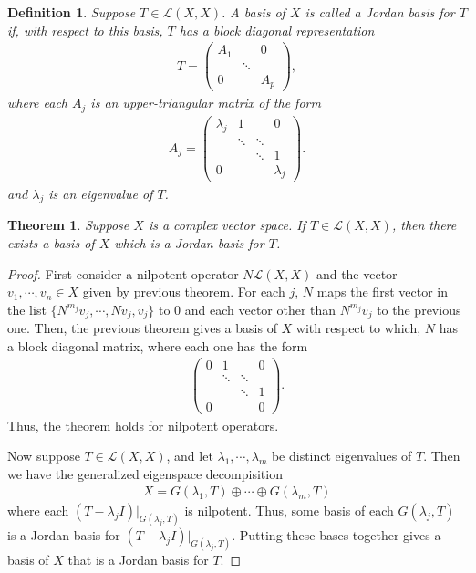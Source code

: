 \documentclass[11pt]{book}
\newtheorem{definition}{Definition}[section]
\newtheorem{theorem}{Theorem}[section]
\theoremstyle{definition}
\numberwithin{equation}{chapter}
\begin{document}
\medskip

\begin{definition}
Suppose $T\in\mathcal{L}(X,X)$. A basis of $X$ is called a Jordan basis for $T$ if, with respect to this basis, $T$ has a block diagonal representation
\begin{align*}
    T = \begin{pmatrix}
    A_1 &  & 0 \\
     & \ddots &  \\
    0 &  & A_p 
    \end{pmatrix},
\end{align*}
where each $A_j$ is an upper-triangular matrix of the form
\begin{align*}
    A_j = \begin{pmatrix}
    \lambda_j & 1 & & 0 \\
     & \ddots &  \ddots & \\
     &  & \ddots & 1 \\
    0 & & & \lambda_j
    \end{pmatrix}.
\end{align*}
and $\lambda_j$ is an eigenvalue of $T$.
\end{definition}

\medskip

\begin{theorem}
Suppose $X$ is a complex vector space. If $T\in\mathcal{L}(X,X)$, then there exists a basis of $X$ which is a Jordan basis for $T$.
\end{theorem}
\begin{proof}
First consider a nilpotent operator $N\mathcal{L}(X,X)$ and the vector $v_1,\cdots,v_n \in X$ given by previous theorem. For each $j$, $N$ maps the first vector in the list $\{N^{m_j}v_j, \cdots, Nv_j,v_j\}$ to $0$ and each vector other than $N^{m_j}v_j$ to the previous one. Then, the previous theorem gives a basis of $X$ with respect to which, $N$ has a block diagonal matrix, where each one has the form 
\begin{align*}
    \begin{pmatrix}
    0 & 1 & & 0 \\
     & \ddots &  \ddots & \\
     &  & \ddots & 1 \\
    0 & & & 0
    \end{pmatrix}.
\end{align*}
Thus, the theorem holds for nilpotent operators. 

Now suppose $T\in\mathcal{L}(X,X)$, and let $\lambda_1,\cdots,\lambda_m$ be distinct eigenvalues of $T$. Then we have the generalized eigenspace decompisition
\begin{align*}
    X = G(\lambda_1, T)\oplus \cdots \oplus G(\lambda_m, T)
\end{align*}
where each $(T-\lambda_j I)|_{G(\lambda_j, T)}$ is nilpotent. Thus, some basis of each $G(\lambda_j,T)$ is a Jordan basis for $(T-\lambda_j I)|_{G(\lambda_j, T)}$. Putting these bases together gives a basis of $X$ that is a Jordan basis for $T$.
\end{proof}
\end{document}

